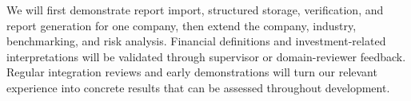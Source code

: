 \documentclass[a4paper,12pt]{article}
\begin{document}
We will first demonstrate report import, structured storage, verification, and report generation for one company, then extend the company, industry, benchmarking, and risk analysis. Financial definitions and investment-related interpretations will be validated through supervisor or domain-reviewer feedback. Regular integration reviews and early demonstrations will turn our relevant experience into concrete results that can be assessed throughout development.
\end{document}
